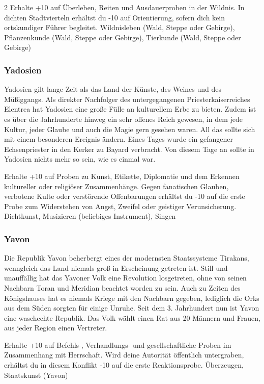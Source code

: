 {\begin{multicols*}{2}
        \abstammungspielwertebox
        {Erhalte +10 auf Überleben, Reiten und Ausdauerproben in der Wildnis.}
        {In dichten Stadtvierteln erhältst du -10 auf Orientierung, sofern dich kein ortskundiger Führer begleitet.}
        {Wildnisleben (Wald, Steppe oder Gebirge), Pflanzenkunde (Wald, Steppe oder Gebirge), Tierkunde (Wald, Steppe oder Gebirge)}

        \subsubsection*{Yadosien}
        Yadosien gilt lange Zeit als das Land der Künste, des Weines und des Müßiggangs. Als direkter Nachfolger des untergegangenen Priesterkaiserreiches Elentrea hat Yadosien eine große Fülle an kulturellem Erbe zu bieten. Zudem ist es über die Jahrhunderte hinweg ein sehr offenes Reich gewesen, in dem jede Kultur, jeder Glaube und auch die Magie gern gesehen waren. All das sollte sich mit einem besonderen Ereignis ändern. Eines Tages wurde ein gefangener Echsenpriester in den Kerker zu Bayard verbracht. Von diesem Tage an sollte in Yadosien nichts mehr so sein, wie es einmal war.

        \abstammungspielwertebox
        {Erhalte +10 auf Proben zu Kunst, Etikette, Diplomatie und dem Erkennen kultureller oder religiöser Zusammenhänge.}
        {Gegen fanatischen Glauben, verbotene Kulte oder verstörende Offenbarungen erhältst du -10 auf die erste Probe zum Widerstehen von Angst, Zweifel oder geistiger Verunsicherung.}
        {Dichtkunst, Musizieren (beliebiges Instrument), Singen}

        \subsubsection*{Yavon}
        Die Republik Yavon beherbergt eines der modernsten Staatssysteme Tirakans, wenngleich das Land niemals groß in Erscheinung getreten ist. Still und unauffällig hat das Yavoner Volk eine Revolution losgetreten, ohne von seinen Nachbarn Toran und Meridian beachtet worden zu sein. Auch zu Zeiten des Königshauses hat es niemals Kriege mit den Nachbarn gegeben, lediglich die Orks aus dem Süden sorgten für einige Unruhe. Seit dem 3. Jahrhundert nun ist Yavon eine waschechte Republik. Das Volk wählt einen Rat aus 20 Männern und Frauen, aus jeder Region einen Vertreter.

        \abstammungspielwertebox
        {Erhalte +10 auf Befehls-, Verhandlungs- und gesellschaftliche Proben im Zusammenhang mit Herrschaft.}
        {Wird deine Autorität öffentlich untergraben, erhältst du in diesem Konflikt -10 auf die erste Reaktionsprobe.}
        {Überzeugen, Staatskunst (Yavon)}


\end{multicols*}}
